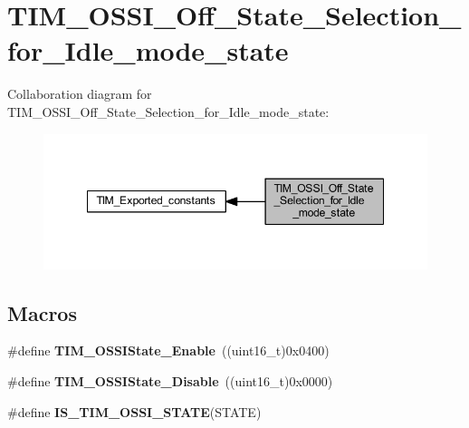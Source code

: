 \hypertarget{group___t_i_m___o_s_s_i___off___state___selection__for___idle__mode__state}{}\section{T\+I\+M\+\_\+\+O\+S\+S\+I\+\_\+\+Off\+\_\+\+State\+\_\+\+Selection\+\_\+for\+\_\+\+Idle\+\_\+mode\+\_\+state}
\label{group___t_i_m___o_s_s_i___off___state___selection__for___idle__mode__state}
Collaboration diagram for T\+I\+M\+\_\+\+O\+S\+S\+I\+\_\+\+Off\+\_\+\+State\+\_\+\+Selection\+\_\+for\+\_\+\+Idle\+\_\+mode\+\_\+state\+:\nopagebreak
\begin{figure}[H]
\begin{center}
\leavevmode
\includegraphics[width=348pt]{group___t_i_m___o_s_s_i___off___state___selection__for___idle__mode__state}
\end{center}
\end{figure}
\subsection*{Macros}
\begin{DoxyCompactItemize}
\item 
\mbox{\label{group___t_i_m___o_s_s_i___off___state___selection__for___idle__mode__state_gaf643ec0d2edb6c8fb725d00210b3d071}} 
\#define {\bfseries T\+I\+M\+\_\+\+O\+S\+S\+I\+State\+\_\+\+Enable}~((uint16\+\_\+t)0x0400)
\item 
\mbox{\label{group___t_i_m___o_s_s_i___off___state___selection__for___idle__mode__state_gae1962736fd5cad82e97a5814ef6758bd}} 
\#define {\bfseries T\+I\+M\+\_\+\+O\+S\+S\+I\+State\+\_\+\+Disable}~((uint16\+\_\+t)0x0000)
\item 
\#define {\bfseries I\+S\+\_\+\+T\+I\+M\+\_\+\+O\+S\+S\+I\+\_\+\+S\+T\+A\+TE}(S\+T\+A\+TE)
\end{DoxyCompactItemize}


